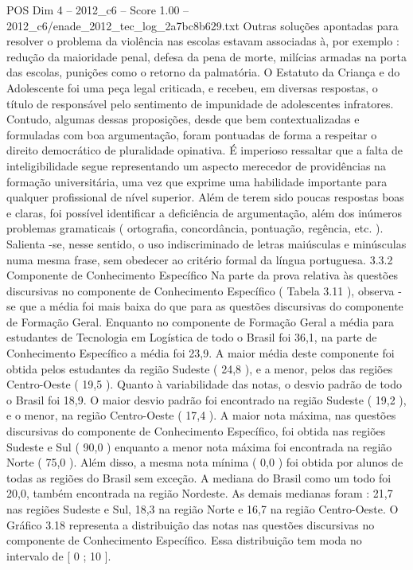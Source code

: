 \begin{textsample}{POS Dim 4 – 2012\_c6 – Score 1.00 – 2012\_c6/enade\_2012\_tec\_log\_2a7bc8b629.txt}
Outras soluções apontadas para resolver o problema da violência nas escolas estavam associadas à, por exemplo : redução da maioridade penal, defesa da pena de morte, milícias armadas na porta das escolas, punições como o retorno da palmatória.
O Estatuto da Criança e do Adolescente foi uma peça legal criticada, e recebeu, em diversas respostas, o título de responsável pelo sentimento de impunidade de adolescentes infratores.
Contudo, algumas dessas proposições, desde que bem contextualizadas e formuladas com boa argumentação, foram pontuadas de forma a respeitar o direito democrático de pluralidade opinativa.
É imperioso ressaltar que a falta de inteligibilidade segue representando um aspecto merecedor de providências na formação universitária, uma vez que exprime uma habilidade importante para qualquer profissional de nível superior.
Além de terem sido poucas respostas boas e claras, foi possível identificar a deficiência de argumentação, além dos inúmeros problemas gramaticais ( ortografia, concordância, pontuação, regência, etc. ).
Salienta -se, nesse sentido, o uso indiscriminado de letras maiúsculas e minúsculas numa mesma frase, sem obedecer ao critério formal da língua portuguesa. 3.3.2 Componente de Conhecimento Específico Na parte da prova relativa às questões discursivas no componente de Conhecimento Específico ( Tabela 3.11 ), observa -se que a média foi mais baixa do que para as questões discursivas do componente de Formação Geral.
Enquanto no componente de Formação Geral a média para estudantes de Tecnologia em Logística de todo o Brasil foi 36,1, na parte de Conhecimento Específico a média foi 23,9.
A maior média deste componente foi obtida pelos estudantes da região Sudeste ( 24,8 ), e a menor, pelos das regiões Centro-Oeste ( 19,5 ).
Quanto à variabilidade das notas, o desvio padrão de todo o Brasil foi 18,9.
O maior desvio padrão foi encontrado na região Sudeste ( 19,2 ), e o menor, na região Centro-Oeste ( 17,4 ).
A maior nota máxima, nas questões discursivas do componente de Conhecimento Específico, foi obtida nas regiões Sudeste e Sul ( 90,0 ) enquanto a menor nota máxima foi encontrada na região Norte ( 75,0 ).
Além disso, a mesma nota mínima ( 0,0 ) foi obtida por alunos de todas as regiões do Brasil sem exceção.
A mediana do Brasil como um todo foi 20,0, também encontrada na região Nordeste.
As demais medianas foram : 21,7 nas regiões Sudeste e Sul, 18,3 na região Norte e 16,7 na região Centro-Oeste.
O Gráfico 3.18 representa a distribuição das notas nas questões discursivas no componente de Conhecimento Específico.
Essa distribuição tem moda no intervalo de [ 0 ; 10 ].

\end{textsample}
